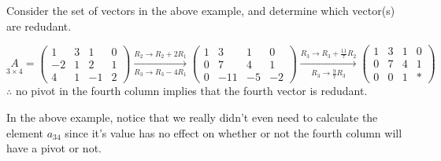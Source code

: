 \begin{example}{}{}
    Consider the set of vectors in the above example, and determine which vector(s) are redudant.
    \begin{solution}
        \[
            \underset{3 \times 4}{A} =
            \begin{pmatrix}
                1 & 3 & 1 & 0 \\
                -2 & 1 & 2 & 1 \\
                4 & 1 & -1 & 2
            \end{pmatrix} 
            \xrightarrow[R_3 \to R_3 - 4R_1]{R_2 \to R_2 + 2R_1}
            \begin{pmatrix}
                1 & 3 & 1 & 0 \\
                0 & 7 & 4 & 1 \\
                0 & -11 & -5 & -2
            \end{pmatrix} 
            \xrightarrow[R_3 \to \frac{9}{7}R_3]{R_3 \to R_3 + \frac{11}{7}R_2}
            \begin{pmatrix}
                1 & 3 & 1 & 0 \\
                0 & 7 & 4 & 1 \\
                0 & 0 & 1 & *
            \end{pmatrix} 
        \]
        $\therefore$ no pivot in the fourth column implies that the fourth vector is redudant.
    \end{solution}
\end{example}

In the above example, notice that we really didn't even need to calculate the element $a_{34}$ since it's value has no effect on whether or not the fourth column will have a pivot or not. 

